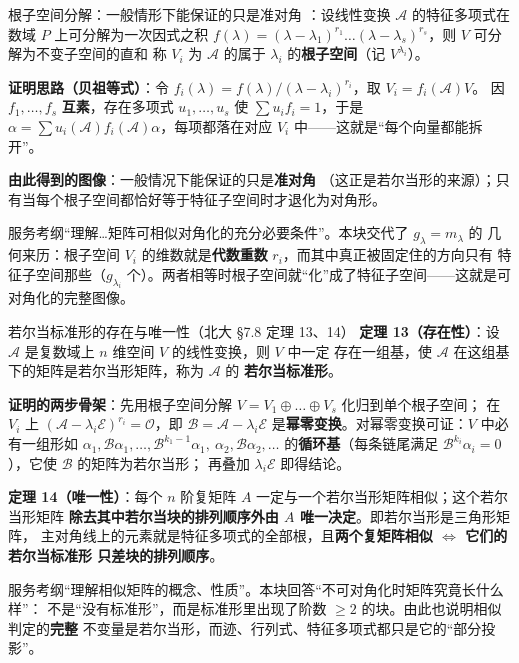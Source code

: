 \begin{fdeep}{根子空间分解：一般情形下能保证的只是准对角}
：设线性变换 $\mathscr{A}$ 的特征多项式在数域 $P$ 上可分解为一次因式之积
$f(\lambda)=(\lambda-\lambda_1)^{r_1}\dots(\lambda-\lambda_s)^{r_s}$，则 $V$ 可分解为不变子空间的直和
称 $V_i$ 为 $\mathscr{A}$ 的属于 $\lambda_i$ 的\textbf{根子空间}（记 $V^{\lambda_i}$）。

\textbf{证明思路（贝祖等式）}：令 $f_i(\lambda)=f(\lambda)/(\lambda-\lambda_i)^{r_i}$，取 $V_i=f_i(\mathscr{A})V$。
因 $f_1,\dots,f_s$ \textbf{互素}，存在多项式 $u_1,\dots,u_s$ 使 $\sum u_if_i=1$，于是
$\alpha=\sum u_i(\mathscr{A})f_i(\mathscr{A})\alpha$，每项都落在对应 $V_i$ 中——这就是“每个向量都能拆开”。

\textbf{由此得到的图像}：一般情况下能保证的只是\textbf{准对角}
（这正是若尔当形的来源）；只有当每个根子空间都恰好等于特征子空间时才退化为对角形。

\fbref{}服务考纲“理解…矩阵可相似对角化的充分必要条件”。本块交代了 $g_\lambda=m_\lambda$ 的
几何来历：根子空间 $V_i$ 的维数就是\textbf{代数重数} $r_i$，而其中真正被固定住的方向只有
特征子空间那些（$g_{\lambda_i}$ 个）。两者相等时根子空间就“化”成了特征子空间——这就是可对角化的完整图像。
\end{fdeep}

\begin{fdeep}{若尔当标准形的存在与唯一性（北大 §7.8 定理 13、14）}
\textbf{定理 13（存在性）}：设 $\mathscr{A}$ 是复数域上 $n$ 维空间 $V$ 的线性变换，则 $V$ 中一定
存在一组基，使 $\mathscr{A}$ 在这组基下的矩阵是若尔当形矩阵，称为 $\mathscr{A}$ 的
\textbf{若尔当标准形}。

\textbf{证明的两步骨架}：先用根子空间分解 $V=V_1\oplus\dots\oplus V_s$ 化归到单个根子空间；
在 $V_i$ 上 $(\mathscr{A}-\lambda_i\mathscr{E})^{r_i}=\mathscr{O}$，即 $\mathscr{B}=\mathscr{A}-\lambda_i\mathscr{E}$
是\textbf{幂零变换}。对幂零变换可证：$V$ 中必有一组形如
$\alpha_1,\mathscr{B}\alpha_1,\dots,\mathscr{B}^{k_1-1}\alpha_1,\ \alpha_2,\mathscr{B}\alpha_2,\dots$
的\textbf{循环基}（每条链尾满足 $\mathscr{B}^{k_i}\alpha_i=0$），它使 $\mathscr{B}$ 的矩阵为若尔当形；
再叠加 $\lambda_i\mathscr{E}$ 即得结论。

\textbf{定理 14（唯一性）}：每个 $n$ 阶复矩阵 $A$ 一定与一个若尔当形矩阵相似；这个若尔当形矩阵
\textbf{除去其中若尔当块的排列顺序外由 $A$ 唯一决定}。即若尔当形是三角形矩阵，
主对角线上的元素就是特征多项式的全部根，且\textbf{两个复矩阵相似 $\iff$ 它们的若尔当标准形
只差块的排列顺序}。

\fbref{}服务考纲“理解相似矩阵的概念、性质”。本块回答“不可对角化时矩阵究竟长什么样”：
不是“没有标准形”，而是标准形里出现了阶数 $\ge2$ 的块。由此也说明相似判定的\textbf{完整}
不变量是若尔当形，而迹、行列式、特征多项式都只是它的“部分投影”。
\end{fdeep}

